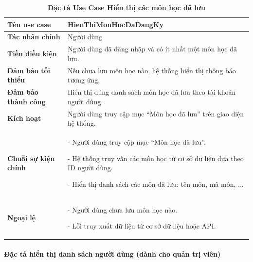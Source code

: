\documentclass{article}
\begin{document}
	\begin{table}[H]
		\centering
		\caption [Đặc tả Use Case Hiển thị các môn học đã lưu]{\bfseries \fontsize{12pt}{0pt}\selectfont Đặc tả Use Case Hiển thị các môn học đã lưu}
		\label{tab38}
		\begin{tabular}{|p{4cm}|p{10.5cm}|}
			\hline
			\textbf{Tên use case} & HienThiMonHocDaDangKy \\
			\hline
			\textbf{Tác nhân chính} & Người dùng \\
			\hline
			\textbf{Tiền điều kiện} & Người dùng đã đăng nhập và có ít nhất một môn học đã lưu. \\
			\hline
			\textbf{Đảm bảo tối thiểu} & Nếu chưa lưu môn học nào, hệ thống hiển thị thông báo tương ứng. \\
			\hline
			\textbf{Đảm bảo thành công} & Hiển thị đúng danh sách môn học đã lưu theo tài khoản người dùng. \\
			\hline
			\textbf{Kích hoạt} & Người dùng truy cập mục “Môn học đã lưu” trên giao diện hệ thống. \\
			\hline
			\textbf{Chuỗi sự kiện chính} &
			- Người dùng truy cập mục “Môn học đã lưu”.
			
			- Hệ thống truy vấn các môn học từ cơ sở dữ liệu dựa theo ID người dùng.
			
			- Hiển thị danh sách các môn đã lưu: tên môn, mã môn, ...
			\\
			\hline
			\textbf{Ngoại lệ} &
			- Người dùng chưa lưu môn học nào.
			
			- Lỗi truy xuất dữ liệu từ cơ sở dữ liệu hoặc API.
			\\
			\hline
		\end{tabular}
	\end{table}
	
	\paragraph{Đặc tả hiển thị danh sách người dùng (dành cho quản trị viên)} \mbox{}
	
\end{document}

